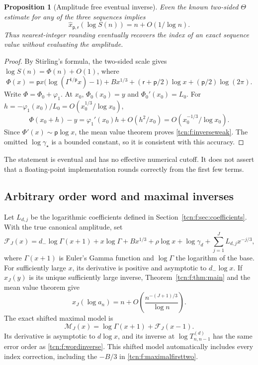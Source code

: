 \documentclass[11pt,letterpaper]{article}
\newtheorem{proposition}[theorem]{Proposition}
\theoremstyle{remark}
\begin{document}
\begin{proposition}[Amplitude free eventual inverse]\label{tcn:f:prop:amplitudefree}
Even the known two-sided $\Theta$ estimate for any of the three sequences implies
\begin{equation}\label{tcn:f:inverseweak}
 \hat x_{\mathsf p,\mathsf r}(\log S(n))=n+O(1/\log n).
\end{equation}
Thus nearest-integer rounding eventually recovers the index of an exact sequence value without evaluating the amplitude.
\end{proposition}
\begin{proof}
By Stirling's formula, the two-sided scale gives $\log S(n)=\Phi(n)+O(1)$, where
\[
 \Phi(x)=\mathsf px\bigl(\log(\Gamma^{1/\mathsf p}x)-1\bigr)
   +Bx^{1/3}+(\mathsf r+\mathsf p/2)\log x+(\mathsf p/2)\log(2\pi).
\]
Write $\Phi=\Phi_0+\varphi_1$. At $x_0$, $\Phi_0(x_0)=y$ and $\Phi_0'(x_0)=L_0$. For $h=-\varphi_1(x_0)/L_0=O(x_0^{1/3}/\log x_0)$,
\[
 \Phi(x_0+h)-y=\varphi_1'(x_0)h+O(h^2/x_0)
                   =O(x_0^{-1/3}/\log x_0).
\]
Since $\Phi'(x)\sim\mathsf p\log x$, the mean value theorem proves \eqref{tcn:f:inverseweak}. The omitted $\log\gamma_\star$ is a bounded constant, so it is consistent with this accuracy.
\end{proof}
The statement is eventual and has no effective numerical cutoff. It does not assert that a floating-point implementation rounds correctly from the first few terms.

\subsection{Arbitrary order word and maximal inverses}
Let $L_{d,j}$ be the logarithmic coefficients defined in Section~\ref{tcn:f:sec:coefficients}. With the true canonical amplitude, set
\begin{equation}\label{tcn:f:FJ}
 \mathcal F_J(x)=d_-\log\Gamma(x+1)+x\log\Gamma+Bx^{1/3}
 +\rho\log x+\log\gamma_d+\sum_{j=1}^JL_{d,j}x^{-j/3},
\end{equation}
where $\Gamma(x+1)$ is Euler's Gamma function and $\log\Gamma$ the logarithm of the base. For sufficiently large $x$, its derivative is positive and asymptotic to $d_-\log x$. If $x_J(y)$ is its unique sufficiently large inverse, Theorem~\ref{tcn:f:thm:main} and the mean value theorem give
\begin{equation}\label{tcn:f:wordinverse}
 x_J(\log a_n)=n+O\left(\frac{n^{-(J+1)/3}}{\log n}\right).
\end{equation}
The exact shifted maximal model is
\begin{equation}\label{tcn:f:MJ}
 \mathcal M_J(x)=\log\Gamma(x+1)+\mathcal F_J(x-1).
\end{equation}
Its derivative is asymptotic to $d\log x$, and its inverse at $\log T^{(d)}_{n,n-1}$ has the same error order as \eqref{tcn:f:wordinverse}. This shifted model automatically includes every index correction, including the $-B/3$ in \eqref{tcn:f:maximalfirsttwo}.
\end{document}
